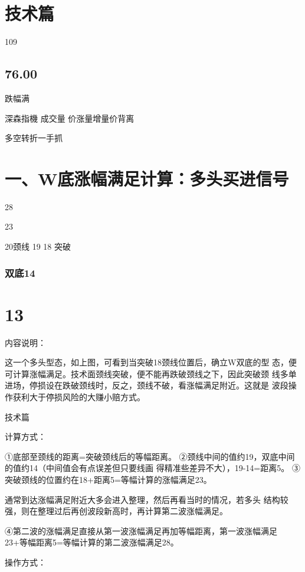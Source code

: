 \documentclass{article}
\begin{document}
\section{技术篇}

109

\subsection{76.00}

跌幅满

深森指機 成交量 价涨量增量价背离

\clearpage

多空转折一手抓

\section{一、W底涨幅满足计算：多头买进信号}

28

23

20颈线 19 18 突破

\subsubsection{双底14}

\section{13}

内容说明：

这一个多头型态，如上图，可看到当突破18颈线位置后，确立W双底的型 态，便可计算涨幅满足。技术面颈线突破，便不能再跌破颈线之下，因此突破颈 线多单进场，停损设在跌破颈线时，反之，颈线不破，看涨幅满足附近。这就是 波段操作获利大于停损风险的大赚小赔方式。

\clearpage

技术篇

计算方式：

①底部至颈线的距离=突破颈线后的等幅距离。 ②颈线中间的值约19，双底中间的值约14（中间值会有点误差但只要线画 得精准些差异不大），19-14=距离5。 ③突破颈线的位置约在18+距离5=等幅计算的涨幅满足23。

通常到达涨幅满足附近大多会进入整理，然后再看当时的情况，若多头 结构较强，则在整理过后再创波段新高时，再计算第二波涨幅满足。

④第二波的涨幅满足直接从第一波涨幅满足再加等幅距离，第一波涨幅满足 23+等幅距离5=等幅计算的第二波涨幅满足28。

操作方式：
\end{document}
